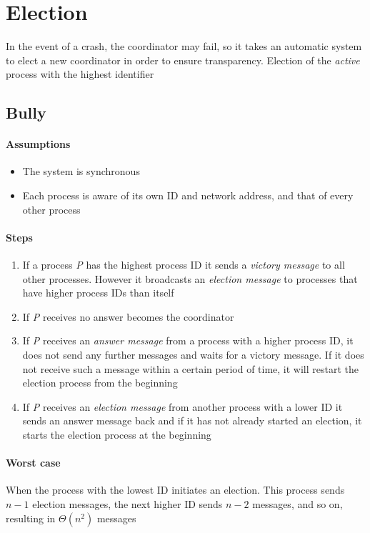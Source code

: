 \section{Election}
In the event of a crash, the coordinator may fail, so it takes an automatic system to elect a new coordinator in order to ensure transparency. Election of the \textit{active} process with the highest identifier

\subsection{Bully}
\paragraph{Assumptions}
\begin{itemize}
    \item The system is synchronous
    \item Each process is aware of its own ID and network address, and that of every other process
\end{itemize}

\paragraph{Steps}
\begin{enumerate}
    \item If a process \textit{P} has the highest process ID it sends a \textit{victory message} to all other processes. However it broadcasts an \textit{election message} to processes that have higher process IDs than itself
    \item If \textit{P} receives no answer becomes the coordinator
    \item If \textit{P} receives an \textit{answer message} from a process with a higher process ID, it does not send any further messages and waits for a victory message. If it does not receive such a message within a certain period of time, it will restart the election process from the beginning
    \item If \textit{P} receives an \textit{election message} from another process with a lower ID it sends an answer message back and if it has not already started an election, it starts the election process at the beginning
\end{enumerate}

\paragraph{Worst case}
When the process with the lowest ID initiates an election. This process sends $n-1$ election messages, the next higher ID sends $n-2$ messages, and so on, resulting in $\Theta(n^2)$ messages

